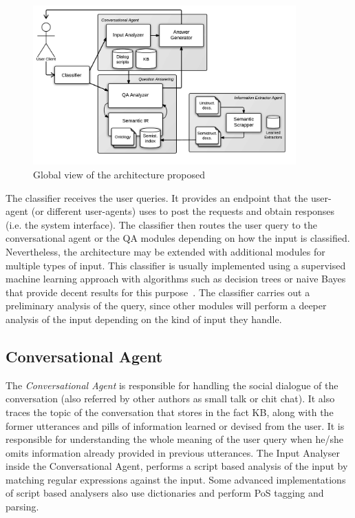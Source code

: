 \begin{figure}[!htbp]
    \centering
    \includegraphics[width=0.9\textwidth]{img/arch/global_1-3.png}
    \caption{Global view of the architecture proposed}
    \label{fig:arch1}
\end{figure}

The classifier receives the user queries. It provides an endpoint that the user-agent (or different user-agents) uses to post the requests and obtain responses (i.e. the system interface). The classifier then routes the user query to the conversational agent or the \ac{QA} modules depending on how the input is classified. Nevertheless, the architecture may be extended with additional modules for multiple types of input. This classifier is usually implemented using a supervised machine learning approach with algorithms such as decision trees or naive Bayes that provide decent results for this purpose~\cite{Samei2014,Moldovan2011}. The classifier carries out a preliminary analysis of the query, since other modules will perform a deeper analysis of the input depending on the kind of input they handle.

\subsection{Conversational Agent}

The {\em Conversational Agent} is responsible for handling the social dialogue of the conversation (also referred by other authors as small talk or chit chat). It also traces the topic of the conversation that stores in the fact \ac{KB}, along with the former utterances and pills of information learned or devised from the user. It is responsible for understanding the whole meaning of the user query when he/she omits information already provided in previous utterances. 
The Input Analyser inside the Conversational Agent, performs a script based analysis of the input by matching regular expressions against the input. Some advanced implementations of script based analysers also use dictionaries and perform \ac{PoS} tagging and parsing.

